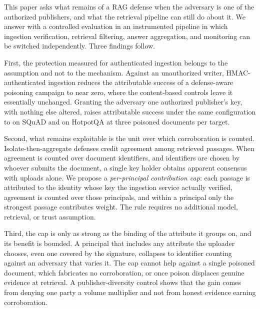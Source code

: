 \documentclass[lettersize,journal]{IEEEtran}
\begin{document}
This paper asks what remains of a RAG defense when the adversary is one of the authorized
publishers, and what the retrieval pipeline can still do about it. We answer with a controlled
evaluation in an instrumented pipeline in which ingestion verification, retrieval filtering,
answer aggregation, and monitoring can be switched independently. Three findings follow.

First, the protection measured for authenticated ingestion belongs to the assumption and not to
the mechanism. Against an unauthorized writer, HMAC-authenticated ingestion reduces the
attributable success of a defense-aware poisoning campaign to near zero, where the
content-based controls leave it essentially unchanged. Granting the adversary one authorized
publisher's key, with nothing else altered, raises attributable success under the same
configuration to \compromiseSignedSquadBThree{} on SQuAD and \compromiseSignedHotpotqaBThree{}
on HotpotQA at three poisoned documents per target.

Second, what remains exploitable is the unit over which corroboration is counted.
Isolate-then-aggregate defenses credit agreement among retrieved passages. When agreement is
counted over document identifiers, and identifiers are chosen by whoever submits the document,
a single key holder obtains apparent consensus with uploads alone. We propose a
\emph{per-principal contribution cap}: each passage is attributed to the identity whose key
the ingestion service actually verified, agreement is counted over those principals, and
within a principal only the strongest passage contributes weight. The rule requires no
additional model, retrieval, or trust assumption.

Third, the cap is only as strong as the binding of the attribute it groups on, and its benefit
is bounded. A principal that includes any attribute the uploader chooses, even one covered by
the signature, collapses to identifier counting against an adversary that varies it. The cap
cannot help against a single poisoned document, which fabricates no corroboration, or once
poison displaces genuine evidence at retrieval. A publisher-diversity control shows that the
gain comes from denying one party a volume multiplier and not from honest evidence earning
corroboration.
\end{document}
